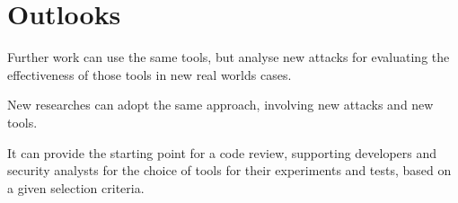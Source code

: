 \section{Outlooks}
Further work can use the same tools, 
but analyse new attacks for evaluating the effectiveness of those tools in new real worlds cases.

New researches can adopt the same approach, involving new attacks and new tools.

It can provide the starting point for a code review, supporting developers 
and security analysts for the choice of tools for their experiments and tests, based on a
given selection criteria.

